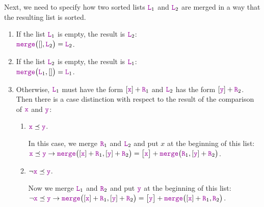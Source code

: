 Next, we need to specify how two sorted lists $\mytt{L}_1$ and $\mytt{L}_2$ are merged in a way that the resulting list
is sorted.
\begin{enumerate}
\item If the list $\mytt{L}_1$ is empty, the result is $\mytt{L}_2$: \\[0.2cm]
      \hspace*{1.3cm} 
      $\mytt{merge}\bigl([], \mytt{L}_2\bigr) = \mytt{L}_2$.
\item If the list $\mytt{L}_2$  is empty, the result is $\mytt{L}_1$: \\[0.2cm]
      \hspace*{1.3cm} 
      $\mytt{merge}\bigl(\mytt{L}_1, []\bigr) = \mytt{L}_1$.
\item Otherwise, $\mytt{L}_1$ must have the form $[\mytt{x}] + \mytt{R}_1$ and $\mytt{L}_2$ has the form $[\mytt{y}] +\mytt{R}_2$.
      Then there is a case distinction with respect to the result of the comparison of $\mytt{x}$ and $\mytt{y}$:
      \begin{enumerate}
      \item $\mytt{x} \preceq \mytt{y}$.

            In this case, we merge $\mytt{R}_1$ and $\mytt{L}_2$ and put $x$ at the beginning of this list:
            \\[0.2cm]
            \hspace*{1.3cm} 
            $\mytt{x} \preceq \mytt{y} \rightarrow \mytt{merge}\bigl([\mytt{x}] + \mytt{R}_1, [\mytt{y}] + \mytt{R}_2\bigr) = \bigl[\mytt{x}\bigr] +
            \mytt{merge}\bigl(\mytt{R}_1,[\mytt{y}] + \mytt{R}_2\bigr)$.
      \item $\neg \mytt{x} \preceq \mytt{y}$.

            Now we merge $\mytt{L}_1$ and $\mytt{R}_2$ and put $\mytt{y}$ at the beginning of this list:
            \\[0.2cm]
            \hspace*{1.3cm} 
            $\neg \mytt{x} \preceq \mytt{y} \rightarrow \mytt{merge}\bigl([\mytt{x}] + \mytt{R}_1, [\mytt{y}] + \mytt{R}_2\bigr) = \bigl[\mytt{y} \bigr] +
             \mytt{merge}\bigl([\mytt{x}] + \mytt{R}_1,\mytt{R}_2\bigr)$.
      \end{enumerate}
\end{enumerate}

